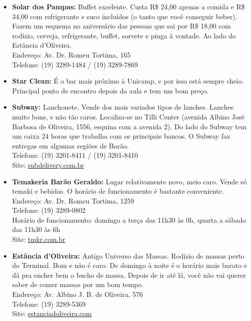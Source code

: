 \begin{itemize}
    \item   \textbf{Solar dos Pampas:} Buffet excelente. Custa R\$ 24,00 apenas
        a comida e R\$ 34,00 com refrigerante e suco incluídos (o tanto que você
        conseguir beber). Fazem um esquema no aniversário das pessoas que sai
        por R\$ 18,00 com rodízio, cerveja, refrigerante, buffet, sorvete e
        pinga à vontade. Ao lado do Estância d'Oliveira.
        \\Endereço: Av. Dr. Romeu Tortima, 165
        \\Telefone: (19) 3289-1484 / (19) 3289-7869

    \item   \textbf{Star Clean:} É o bar mais próximo à Unicamp, e por isso está
        sempre cheio. Principal ponto de encontro depois da aula e tem um bom
        preço.

    \item   \textbf{Subway:} Lanchonete. Vende dos mais variados tipos de
        lanches.  Lanches muito bons, e não tão caros. Localiza-se no Tilli
        Center (avenida Albino José Barbosa de Oliveira, 1556, esquina com a
        avenida 2). Do lado do Subway tem um caixa 24 horas que trabalha com os
        principais bancos. O Subway faz entregas em algumas regiões de Barão.
        \\Telefone: (19) 3201-8411 / (19) 3201-8410
        \\Site: \url{subdelivery.com.br}

     \item   \textbf{Temakeria Barão Geraldo:} Lugar relativamente novo, meio
        caro. Vende só temaki e bebidas. O horário de funcionamento é bastante
        conveniente.
        \\Endereço: Av. Dr. Romeu Tortima, 1259
        \\Telefone: (19) 3289-0802
        \\Horário de funcionamento: domingo a terça das 11h30 às 0h, quarta a
        sábado das 11h30 às 6h
        \\Site: \url{tmkr.com.br}

    \item   \textbf{Estância d'Oliveira:} Antigo Universo das Massas. Rodízio de
        massas perto do Terminal. Bom e não é caro. De domingo à noite é o
        horário mais barato e dá pra encher bem o bucho de massa. Depois de ir
        até lá, você não vai querer saber de comer massas por um bom tempo.
        \\Endereço: Av. Albino J. B. de Oliveira, 576
        \\Telefone: (19) 3289-5369
        \\Site: \url{estanciadoliveira.com}


\end{itemize}
